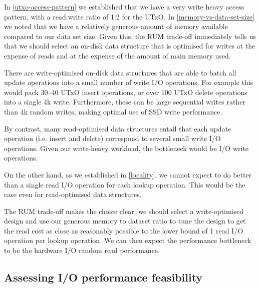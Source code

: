 \documentclass[11pt,a4paper]{article}
\begin{document}
In \cref{utxo-access-pattern} we established that we have a very write heavy
access pattern, with a read:write ratio of 1:2 for the UTxO. In
\cref{memory-vs-data-set-size} we noted that we have a relatively generous
amount of memory available compared to our data set size. Given this, the RUM
trade-off immediately tells us that we should select an on-disk data structure
that is optimised for writes at the expense of reads and at the expense of the
amount of main memory used.

There are write-optimised on-disk data structures that are able to batch all
update operations into a small number of write I/O operations. For example this
would pack 30--40 UTxO {\sc insert} operations, or over 100 UTxO {\sc delete}
operations into a single 4k write. Furthermore, these can be large sequential
writes rather than 4k random writes, making optimal use of SSD write
performance.

By contrast, many read-optimised data structures entail that each update
operation (i.e. {\sc insert} and {\sc delete}) correspond to several small
write I/O operations. Given our write-heavy workload, the bottleneck would be
I/O write operations.

On the other hand, as we established in \cref{locality}, we cannot expect to do
better than a single read I/O operation for each {\sc lookup} operation. This
would be the case even for read-optimised data structures.

The RUM trade-off makes the choice clear: we should select a write-optimised
design and use our generous memory to dataset ratio to tune the design to get
the read cost as close as reasonably possible to the lower bound of 1 read I/O
operation per {\sc lookup} operation. We can then expect the performance
bottleneck to be the hardware I/O random read performance.

\subsection{Assessing I/O performance feasibility}
\label{assessing-feasibility}
\end{document}
